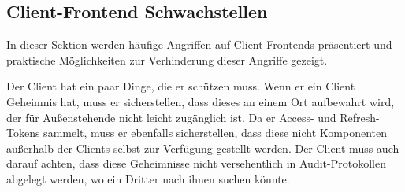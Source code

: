 \subsection{Client-Frontend Schwachstellen}

In dieser Sektion werden häufige Angriffen auf Client-Frontends präsentiert und praktische Möglichkeiten zur Verhinderung dieser Angriffe gezeigt.

Der Client hat ein paar Dinge, die er schützen muss. Wenn er ein Client Geheimnis hat, muss er sicherstellen, dass dieses an einem Ort aufbewahrt wird, der für Außenstehende nicht leicht zugänglich ist. Da er Access- und Refresh-Tokens sammelt, muss er ebenfalls sicherstellen, dass diese nicht Komponenten außerhalb der Clients selbst zur Verfügung gestellt werden. Der Client muss auch darauf achten, dass diese Geheimnisse nicht versehentlich in Audit-Protokollen abgelegt werden, wo ein Dritter nach ihnen suchen könnte.

